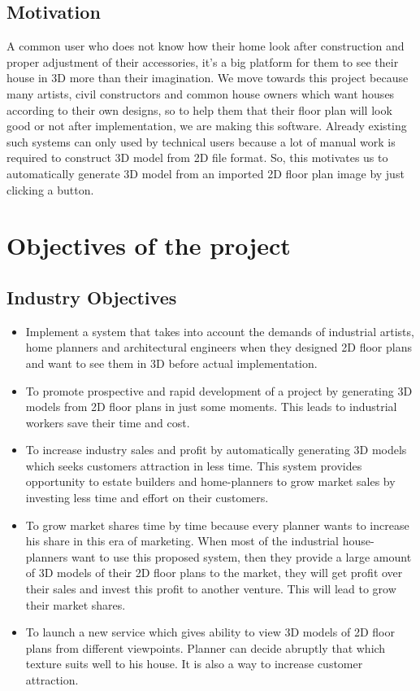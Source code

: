 \documentclass{article}
\begin{document}
\subsection{Motivation}
A common user who does not know how their home look after construction and proper adjustment of their accessories, it’s a big platform for them to see their house in 3D more than their imagination. We move towards this project because many artists, civil constructors and common house owners which want houses according to their own designs, so to help them that their floor plan will look good or not after implementation, we are making this software. Already existing such systems can only used by technical users because a lot of manual work is required to construct 3D model from 2D file format. So, this motivates us to automatically generate 3D model from an imported 2D floor plan image by just clicking a button.\cite{research}\\
\section{Objectives of the project}
\subsection{Industry Objectives}
\begin{itemize}
\item Implement a system that takes into account the demands of industrial artists, home planners and architectural engineers when they designed 2D floor plans and want to see them in 3D before actual implementation.
\item To promote prospective and rapid development of a project by generating 3D models from 2D floor plans in just some moments. This leads to industrial workers save their time and cost.
\item To increase industry sales and profit by automatically generating 3D models which seeks customers attraction in less time. This system provides opportunity to estate builders and home-planners to grow market sales by investing less time and effort on their customers.
\item To grow market shares time by time because every planner wants to increase his share in this era of marketing. When most of the industrial house-planners want to use this proposed system, then they provide a large amount of 3D models of their 2D floor plans to the market, they will get profit over their sales and invest this profit to another venture. This will lead to grow their market shares.
\item To launch a new service which gives ability to view 3D models of 2D floor plans from different viewpoints. Planner can decide abruptly that which texture suits well to his house. It is also a way to increase customer attraction.
\end{itemize}
\end{document}
